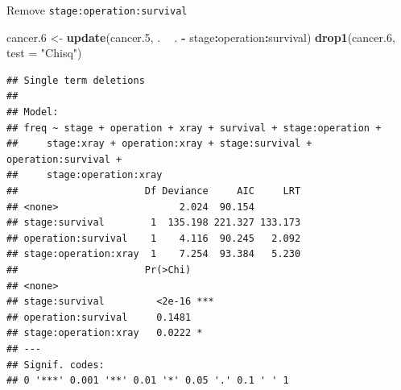 \documentclass[ignorenonframetext,]{beamer}
\newenvironment{Shaded}{\begin{snugshade}}{\end{snugshade}}
\newcommand{\DataTypeTok}[1]{\textcolor[rgb]{0.13,0.29,0.53}{#1}}
\newcommand{\FloatTok}[1]{\textcolor[rgb]{0.00,0.00,0.81}{#1}}
\newcommand{\KeywordTok}[1]{\textcolor[rgb]{0.13,0.29,0.53}{\textbf{#1}}}
\newcommand{\NormalTok}[1]{#1}
\newcommand{\OperatorTok}[1]{\textcolor[rgb]{0.81,0.36,0.00}{\textbf{#1}}}
\newcommand{\StringTok}[1]{\textcolor[rgb]{0.31,0.60,0.02}{#1}}
\begin{document}
\begin{frame}[fragile]{Remove \texttt{stage:operation:survival}}
\protect\hypertarget{remove-stageoperationsurvival}{}

\begin{Shaded}
\begin{Highlighting}[]
\NormalTok{cancer}\FloatTok{.6}\NormalTok{ <-}\StringTok{ }\KeywordTok{update}\NormalTok{(cancer}\FloatTok{.5}\NormalTok{, . }\OperatorTok{~}\StringTok{ }\NormalTok{. }\OperatorTok{-}\StringTok{ }\NormalTok{stage}\OperatorTok{:}\NormalTok{operation}\OperatorTok{:}\NormalTok{survival)}
\KeywordTok{drop1}\NormalTok{(cancer}\FloatTok{.6}\NormalTok{, }\DataTypeTok{test =} \StringTok{"Chisq"}\NormalTok{)}
\end{Highlighting}
\end{Shaded}

\begin{verbatim}
## Single term deletions
## 
## Model:
## freq ~ stage + operation + xray + survival + stage:operation + 
##     stage:xray + operation:xray + stage:survival + operation:survival + 
##     stage:operation:xray
##                      Df Deviance     AIC     LRT
## <none>                     2.024  90.154        
## stage:survival        1  135.198 221.327 133.173
## operation:survival    1    4.116  90.245   2.092
## stage:operation:xray  1    7.254  93.384   5.230
##                      Pr(>Chi)    
## <none>                           
## stage:survival         <2e-16 ***
## operation:survival     0.1481    
## stage:operation:xray   0.0222 *  
## ---
## Signif. codes:  
## 0 '***' 0.001 '**' 0.01 '*' 0.05 '.' 0.1 ' ' 1
\end{verbatim}

\end{frame}
\end{document}
